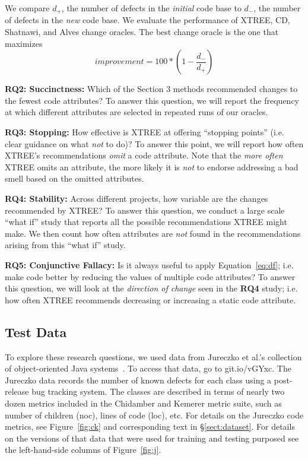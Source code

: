 \documentclass[twocolumn,5p]{elsarticle}
\newcommand{\tion}[1]{\S\ref{sect:#1}}
\newcommand{\fig}[1]{Figure~\ref{fig:#1}}
\newcommand{\eq}[1]{Equation~\ref{eq:#1}}
\theoremstyle{break}
\begin{document}
	We compare $d_+$, the number of defects in the \textit{initial} code base 
	to $d_-$, the number of defects in the \textit{new} code base.
	We evaluate the performance of XTREE, CD, Shatnawi, and Alves change 
	oracles. The best change oracle is the one that maximizes
	\begin{equation}\label{eq:diff}
		\mathit{improvement} = 100* \left(1 - \frac{ d_- }{ d_+}\right)
	\end{equation}
	
	
	{\bf RQ2: Succinctness: } Which of the Section 3 methods recommended 
	changes to the fewest code attributes?
	To answer this question, we will report the frequency at which different 
	attributes are selected in repeated runs of our oracles.
	
	{\bf RQ3: Stopping: }    How effective is XTREE at offering   ``stopping 
	points'' (i.e. clear guidance on what {\em not} to do)?
	To answer this point, we will report how often XTREE's recommendations {\em 
	omit} a code attribute. Note that the {\em more often} XTREE omits an 
	attribute, the more likely it is {\em not} to endorse addressing a bad 
	smell based on the omitted attributes.
	
	{\bf RQ4: Stability:} Across different projects, how variable are the 
	changes recommended by XTREE?   To answer this
	question, we conduct a large scale ``what if'' study that reports all the 
	possible recommendations XTREE might make. We then count how often 
	attributes are {\em not} found in the recommendations arising from this 
	``what if'' study.
	
	{\bf RQ5: Conjunctive Fallacy:} Is  it  always  useful  to  apply \eq{df}; 
	i.e.   make  code  better  by  reducing  the  values  of multiple code 
	attributes? To answer this question, we will look at the {\em direction of 
	change} seen in the {\bf RQ4} study; i.e.
	how often XTREE recommends decreasing or increasing a static code attribute.
	
	\subsection{Test Data}\label{sect:tesd}
	
	To explore these research questions, we used data from Jureczko et al.'s 
	collection of object-oriented Java systems~\cite{jureczko10}. To access 
	that data, go to   git.io/vGYxc.
	The Jureczko data records the number of known defects for each class using 
	a post-release bug tracking system. The classes are described in terms of 
	nearly two dozen metrics included in the Chidamber and Kemerer metric 
	suite, such as number of children (noc), lines of code (loc), etc. For 
	details on the Jureczko code
	metrics, see  \fig{ck} and corresponding text in \tion{dataset}. For 
	details on the versions of that data that were used for training and 
	testing purposed see the left-hand-side columns of \fig{j}.
	
\end{document}
